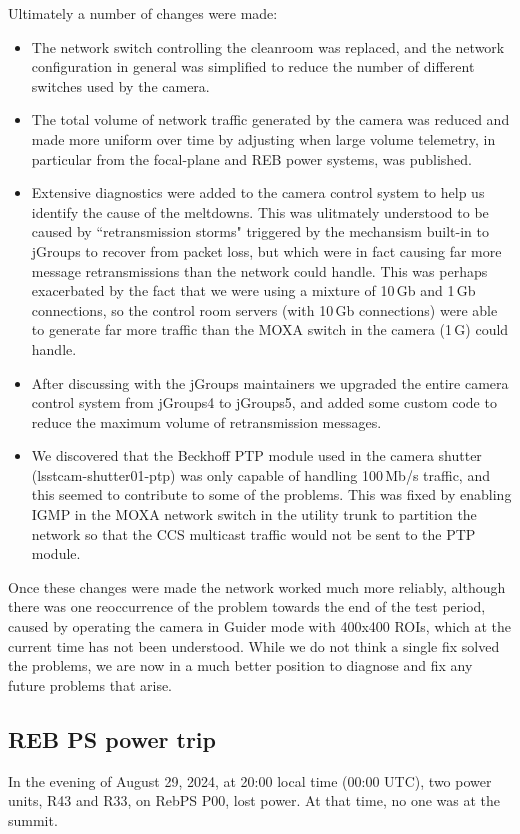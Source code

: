 Ultimately a number of changes were made:

\begin{itemize}
\item The network switch controlling the cleanroom was replaced, and the network configuration in general was simplified to reduce the number of different switches used by the camera.
\item The total volume of network traffic generated by the camera was reduced and made more uniform over time by adjusting when large volume telemetry, in particular from the focal-plane and REB power systems, was published.
\item Extensive diagnostics were added to the camera control system to help us identify the cause of the meltdowns. This was ulitmately understood to be caused by ``retransmission storms" triggered by the mechansism built-in to jGroups to recover from packet loss, but which were in fact causing far more message retransmissions than the network could handle. This was perhaps exacerbated by the fact that we were using a mixture of 10\,Gb and 1\,Gb connections, so the control room servers (with 10\,Gb connections) were able to generate far more traffic than the MOXA switch in the camera (1\,G) could handle.
\item After discussing with the jGroups maintainers we upgraded the entire camera control system from jGroups4 to jGroups5, and added some custom code to reduce the maximum volume of retransmission messages.
\item We discovered that the Beckhoff PTP module used in the camera shutter (lsstcam-shutter01-ptp) was only capable of handling 100\,Mb/s traffic, and this seemed to contribute to some of the problems. This was fixed by enabling IGMP in the MOXA network switch in the utility trunk to partition the network so that the CCS multicast traffic would not be sent to the PTP module.
\end{itemize}

Once these changes were made the network worked much more reliably, although there was one reoccurrence of the problem towards the end of the test period, caused by operating the camera in Guider mode with 400x400 ROIs, which at the current time has not been understood. While we do not think a single fix solved the problems, we are now in a much better position to diagnose and fix any future problems that arise.

\clearpage
\subsection{REB PS power trip}\label{sec:rebpstripped}
In the evening of August 29, 2024, at 20:00 local time (00:00 UTC), two power units, R43 and R33, on RebPS P00, lost power. At that time, no one was at the summit.

